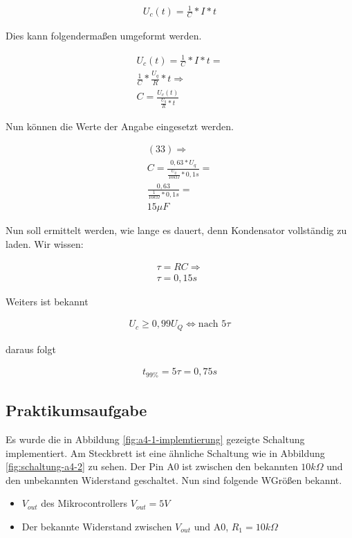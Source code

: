 \begin{align}
    U_c(t) = \frac{1}{C} * I * t
\end{align}

Dies kann folgendermaßen umgeformt werden.

\begin{align}
    U_c(t) = \frac{1}{C} * I * t = \\
    \frac{1}{C} * \frac{U_q}{R} * t \Rightarrow \\
    C = \frac{U_c(t)}{\frac{U_q}{R} * t}
\end{align}

Nun können die Werte der Angabe eingesetzt werden.

\begin{align}
    (33) \Rightarrow \\
    C = \frac{0,63 * U_q}{\frac{U_q}{10k\Omega} * 0,1s} = \\
    \frac{0,63}{\frac{1}{10k\Omega} * 0,1s} = \\
    15\mu F
\end{align}

Nun soll ermittelt werden, wie lange es dauert, denn Kondensator vollständig zu laden.
Wir wissen:

\begin{align}
    \tau = RC \Rightarrow \\
    \tau = 0,15s
\end{align}

Weiters ist bekannt

\begin{align}
    U_c \geq 0,99U_Q \Leftrightarrow \text{nach } 5\tau
\end{align}

daraus folgt

\begin{align}
    t_{99\%} = 5\tau = 0,75s
\end{align}
\subsection{Praktikumsaufgabe}
\label{subsec:a4-praktikumsaufgabe2}

Es wurde die in Abbildung \ref{fig:a4-1-implemtierung} gezeigte Schaltung implementiert.
Am Steckbrett ist eine ähnliche Schaltung wie in Abbildung \ref{fig:schaltung-a4-2} zu sehen.
Der Pin A0 ist zwischen den bekannten $10k\Omega$ und den unbekannten Widerstand geschaltet.
Nun sind folgende WGrößen bekannt.

\begin{itemize}
    \item $V_{out}$ des Mikrocontrollers $V_{out} = 5V$
    \item Der bekannte Widerstand zwischen $V_{out}$ und A0, $R_1 = 10k\Omega$
\end{itemize}

